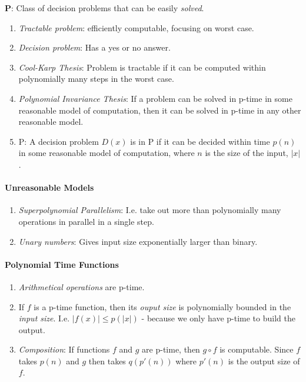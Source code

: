 \documentclass[twocolumn,english]{article}
\begin{document}
\textbf{P}: Class of decision problems that can be easily \emph{solved}.
\begin{enumerate}
\item \emph{Tractable problem}: efficiently computable, focusing on worst
case.
\item \emph{Decision problem}: Has a yes or no answer.
\item \emph{Cool-Karp Thesis}: Problem is tractable if it can be computed
within polynomially many steps in the worst case.
\item \emph{Polynomial Invariance Thesis}: If a problem can be solved in
p-time in some reasonable model of computation, then it can be solved
in p-time in any other reasonable model.
\item P: A decision problem $D\left(x\right)$ is in P if it can be decided
within time $p\left(n\right)$ in some reasonable model of computation,
where $n$ is the size of the input, $\left|x\right|$.
\end{enumerate}

\paragraph{Unreasonable Models}
\begin{enumerate}
\item \emph{Superpolynomial Parallelism}: I.e. take out more than polynomially
many operations in parallel in a single step.
\item \emph{Unary numbers}: Gives input size exponentially larger than binary.
\end{enumerate}

\paragraph{Polynomial Time Functions}
\begin{enumerate}
\item \emph{Arithmetical operations} are p-time.
\item If $f$ is a p-time function, then its \emph{ouput size} is polynomially
bounded in the \emph{input size}. I.e. $\left|f\left(x\right)\right|\leq p\left(\left|x\right|\right)$
- because we only have p-time to build the output.
\item \emph{Composition}: If functions $f$ and $g$ are p-time, then $g\circ f$
is computable. Since $f$ takes $p\left(n\right)$ and $g$ then takes
$q\left(p'\left(n\right)\right)$ where $p'\left(n\right)$ is the
output size of $f$.
\end{enumerate}
\end{document}
